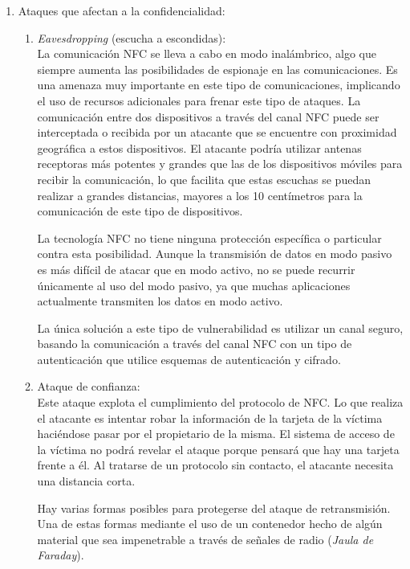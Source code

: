 \documentclass[12pt,a4paper,onecolumn,oneside]{report}
\begin{document}
\begin{enumerate}

\item Ataques que afectan a la confidencialidad:\\
\begin{enumerate}

\item \textit{Eavesdropping} (escucha a escondidas):\\
La comunicación NFC se lleva a cabo en modo inalámbrico, algo que siempre aumenta las posibilidades de espionaje en las comunicaciones. Es una amenaza muy importante en este tipo de comunicaciones, implicando el uso de recursos adicionales para frenar este tipo de ataques.  La comunicación entre dos dispositivos a través del canal NFC puede ser interceptada o recibida por un atacante que se encuentre con proximidad geográfica a estos dispositivos. El atacante podría utilizar antenas receptoras más potentes y grandes que las de los dispositivos móviles para recibir la comunicación, lo que facilita que estas escuchas se puedan realizar a grandes distancias, mayores a los 10 centímetros para la comunicación de este tipo de dispositivos. 

La tecnología NFC no tiene ninguna protección específica o particular contra esta posibilidad. Aunque la transmisión de datos en modo pasivo es más difícil de atacar que en modo activo, no se puede recurrir únicamente al uso del modo pasivo, ya que muchas aplicaciones actualmente transmiten los datos en modo activo.

 La única solución a este tipo de vulnerabilidad es utilizar un canal seguro, basando la comunicación a través del canal NFC con un tipo de autenticación que utilice esquemas de autenticación y cifrado.

\item Ataque de confianza:\\
Este ataque explota el cumplimiento del protocolo de NFC. Lo que realiza el atacante es intentar robar la información de la tarjeta de la víctima haciéndose pasar por el propietario de la misma. El sistema de acceso de la víctima no podrá revelar el ataque porque pensará que hay una tarjeta frente a él. Al tratarse de un protocolo sin contacto, el atacante necesita una distancia corta.

Hay varias formas posibles para protegerse del ataque de retransmisión. Una de estas formas mediante el uso de un contenedor hecho de algún material que sea impenetrable a través de señales de radio (\textit{Jaula de Faraday}).


\end{enumerate}
\end{enumerate}
\end{document}
